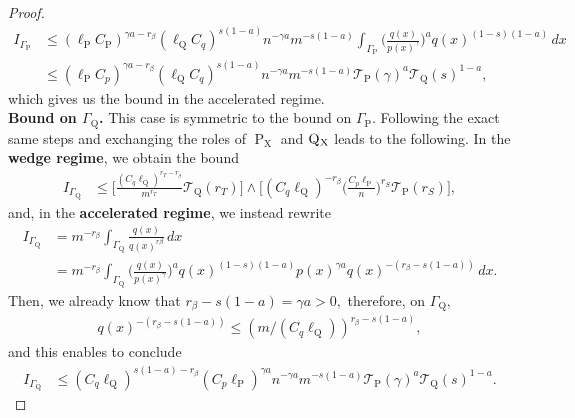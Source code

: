 \documentclass[10pt,a4paper]{amsart}
\renewcommand{\P}{\operatorname{P}}
\newcommand{\Q}{\operatorname{Q}}
\newcommand{\mT}{\mathcal{T}}
\newcommand{\sX}{\mathrm{X}}
\begin{document}
\begin{proof}
    \begin{align*}
        I_{\Gamma_{\P}} &\leq (\ell_{\P}C_{\P})^{\gamma a - r_\beta}(\ell_{\Q}C_q)^{s(1 - a)}n^{-\gamma a}m^{-s(1 - a)}\int_{\Gamma_{\P}}\Big(\frac{q(x)}{p(x)^{\gamma}}\Big)^aq(x)^{(1 - s)(1 - a)}\, dx\\
        &\leq (\ell_{\P}C_{p})^{\gamma a - r_\beta}(\ell_{\Q}C_q)^{s(1 - a)}n^{-\gamma a}m^{-s(1 - a)}\mT_{\P}(\gamma)^{a}\mT_{\Q}(s)^{1-a},
    \end{align*}
    which gives us the bound in the accelerated regime.\\
    
    \noindent\textbf{Bound on $\Gamma_{\Q}$.} This case is symmetric to the bound on $\Gamma_{\P}.$ Following the exact same steps and exchanging the roles of $\P_{\sX}$ and $\Q\mathstrut_{\!\sX}$ leads to the following. In the \textbf{wedge regime}, we obtain the bound
    \begin{align*}
        I_{\Gamma_{\Q}} &\leq \bigg[\frac{(C_q\ell_{\Q})^{r_T - r_\beta}}{m^{r_T}}\mT_{\Q}(r_T)\bigg] \wedge \bigg[(C_q\ell_{\Q})^{-r_\beta}\Big(\frac{C_p\ell_{\P}}{n}\Big)^{r_S}\mT_{\P}(r_S)\bigg],
    \end{align*}
    and, in the \textbf{accelerated regime}, we instead rewrite
    \begin{align*}
        I_{\Gamma_{\Q}} &= m^{-r_\beta}\int_{\Gamma_{\Q}}\frac{q(x)}{q(x)^{r\beta}}\, dx\\
        &= m^{-r_\beta}\int_{\Gamma_{\Q}}\Big(\frac{q(x)}{p(x)^\gamma}\Big)^aq(x)^{(1 - s)(1 - a)}p(x)^{\gamma a}q(x)^{-(r_\beta - s(1 - a))}\, dx.
    \end{align*}
    Then, we already know that $r_\beta - s(1 - a) = \gamma a >0,$ therefore, on $\Gamma_{\Q},$
    \begin{align*}
    q(x)^{-(r_\beta - s(1 - a))} \leq (m/(C_q\ell_{\Q}))^{r_\beta - s(1 - a)},
    \end{align*}
    and this enables to conclude
    \begin{align*}
        I_{\Gamma_{\Q}} &\leq (C_q\ell_{\Q})^{s(1 - a) - r_\beta}(C_p\ell_{\P})^{\gamma a}n^{-\gamma a}m^{-s(1 - a)}\mT_{\P}(\gamma)^{a}\mT_{\Q}(s)^{1 - a}.
    \end{align*}
    

\end{proof}
\end{document}
